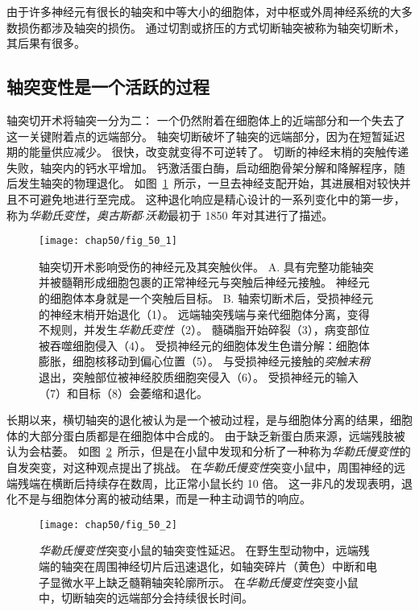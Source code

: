 由于许多神经元有很长的轴突和中等大小的细胞体，对中枢或外周神经系统的大多数损伤都涉及轴突的损伤。
通过切割或挤压的方式切断轴突被称为轴突切断术，其后果有很多。

\subsection{轴突变性是一个活跃的过程}

轴突切开术将轴突一分为二：
一个仍然附着在细胞体上的近端部分和一个失去了这一关键附着点的远端部分。
轴突切断破坏了轴突的远端部分，因为在短暂延迟期的能量供应减少。
很快，改变就变得不可逆转了。
切断的神经末梢的突触传递失败，轴突内的钙水平增加。
钙激活蛋白酶，启动细胞骨架分解和降解程序，随后发生轴突的物理退化。
如图~\ref{fig:50_1}~所示，一旦去神经支配开始，其进展相对较快并且不可避免地进行至完成。
这种退化响应是精心设计的一系列变化中的第一步，称为\textit{华勒氏变性}，\textit{奥古斯都$\cdot$沃勒}最初于 1850 年对其进行了描述。


\begin{figure}[htbp]
	\centering
	\texttt{[image: chap50/fig\_50\_1]}
	\caption{轴突切开术影响受伤的神经元及其突触伙伴。
		A. 具有完整功能轴突并被髓鞘形成细胞包裹的正常神经元与突触后神经元接触。
		神经元的细胞体本身就是一个突触后目标。
		B. 轴索切断术后，受损神经元的神经末梢开始退化（1）。
		远端轴突残端与亲代细胞体分离，变得不规则，并发生\textit{华勒氏变性}（2）。
		髓磷脂开始碎裂（3），病变部位被吞噬细胞侵入（4）。
		受损神经元的细胞体发生色谱分解：细胞体膨胀，细胞核移动到偏心位置（5）。
		与受损神经元接触的\textit{突触末稍}退出，突触部位被神经胶质细胞突侵入（6）。
		受损神经元的输入（7）和目标（8）会萎缩和退化。}
	\label{fig:50_1}
\end{figure}


长期以来，横切轴突的退化被认为是一个被动过程，是与细胞体分离的结果，细胞体的大部分蛋白质都是在细胞体中合成的。
由于缺乏新蛋白质来源，远端残肢被认为会枯萎。
如图~\ref{fig:50_2}~所示，但是在小鼠中发现和分析了一种称为\textit{华勒氏慢变性}的自发突变，对这种观点提出了挑战。 
在\textit{华勒氏慢变性}突变小鼠中，周围神经的远端残端在横断后持续存在数周，比正常小鼠长约 10 倍。
这一非凡的发现表明，退化不是与细胞体分离的被动结果，而是一种主动调节的响应。


\begin{figure}[htbp]
	\centering
	\texttt{[image: chap50/fig\_50\_2]}
	\caption{\textit{华勒氏慢变性}突变小鼠的轴突变性延迟。
		在野生型动物中，远端残端的轴突在周围神经切片后迅速退化，如轴突碎片（黄色）中断和电子显微水平上缺乏髓鞘轴突轮廓所示。
		在\textit{华勒氏慢变性}突变小鼠中，切断轴突的远端部分会持续很长时间\cite{beirowski2004quantitative}。}
	\label{fig:50_2}
\end{figure}


